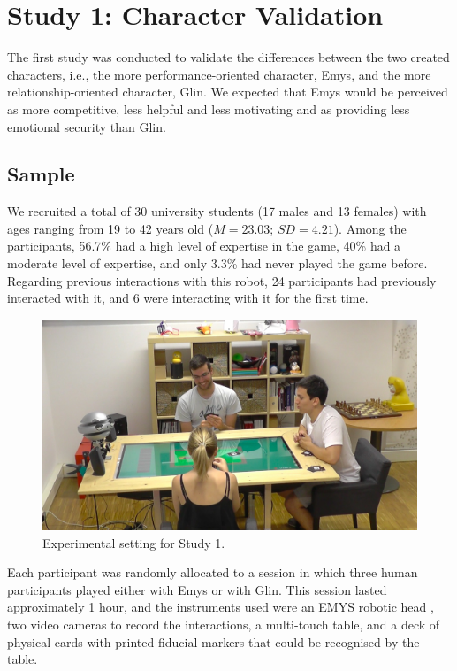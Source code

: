 \section{Study 1: Character Validation}
\label{sec:study1}
The first study was conducted to validate the differences between the two created characters, i.e., the more performance-oriented character, Emys, and the more relationship-oriented character, Glin. We expected that Emys would be perceived as more competitive, less helpful and less motivating and as providing less emotional security than Glin.

\subsection{Sample}
We recruited a total of 30 university students (17 males and 13 females) with ages ranging from 19 to 42 years old ($M=23.03$; $SD=4.21$). Among the participants, 56.7\% had a high level of expertise in the game, 40\% had a moderate level of expertise, and only 3.3\% had never played the game before. Regarding previous interactions with this robot, 24 participants had previously interacted with it, and 6 were interacting with it for the first time.

\begin{figure}[ht]
\centering
\includegraphics[width=0.7\columnwidth]{images/membership/study1}
\caption{Experimental setting for Study 1.}
\label{study1}
\end{figure}

Each participant was randomly allocated to a session in which three human participants played either with Emys or with Glin. 
This session lasted approximately 1 hour, and the instruments used were an EMYS robotic head \cite{kkedzierski2013emys}, two video cameras to record the interactions, a multi-touch table, and a deck of physical cards with printed fiducial markers that could be recognised by the table.

